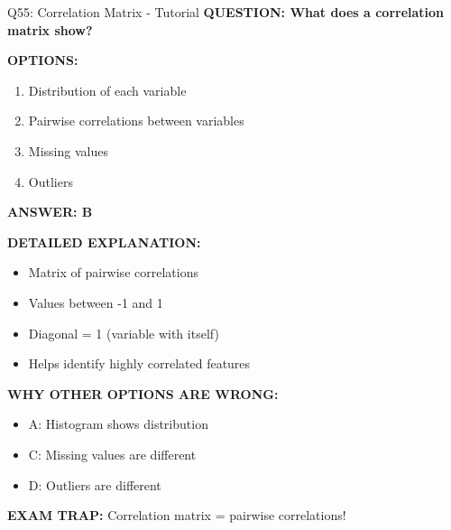 \documentclass[8pt]{beamer}
\begin{document}
	\begin{frame}{Q55: Correlation Matrix - Tutorial}
		\fontsize{6.5}{7.5}\selectfont
		\textbf{QUESTION: What does a correlation matrix show?}
		
		\vspace{0.1cm}
		\textbf{OPTIONS:}
		\begin{enumerate}
			\item Distribution of each variable
			\item Pairwise correlations between variables
			\item Missing values
			\item Outliers
		\end{enumerate}
		
		\vspace{0.1cm}
		\textcolor{myblue}{\textbf{ANSWER: B}}
		
		\vspace{0.1cm}
		\textbf{DETAILED EXPLANATION:}
		\begin{itemize}
			\item Matrix of pairwise correlations
			\item Values between -1 and 1
			\item Diagonal = 1 (variable with itself)
			\item Helps identify highly correlated features
		\end{itemize}
		
		\vspace{0.1cm}
		\textcolor{myred}{\textbf{WHY OTHER OPTIONS ARE WRONG:}}
		\begin{itemize}
			\item \textcolor{myred}{A:} Histogram shows distribution
			\item \textcolor{myred}{C:} Missing values are different
			\item \textcolor{myred}{D:} Outliers are different
		\end{itemize}
		
		\textcolor{myred}{\textbf{EXAM TRAP:}} Correlation matrix = \textcolor{myblue}{pairwise correlations}!
	\end{frame}
	
\end{document}
